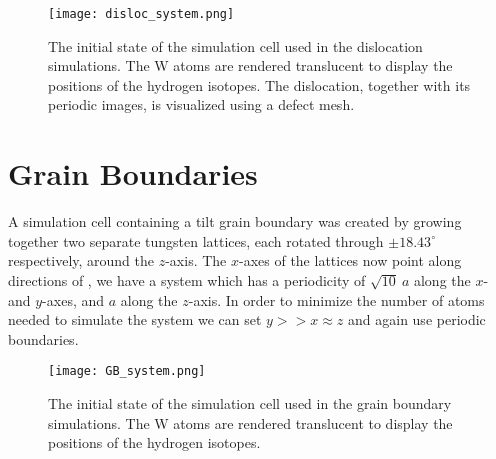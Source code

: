 \begin{figure}[!ht]
\center
\texttt{[image: disloc\_system.png]}
\caption{The initial state of the simulation cell used in the dislocation simulations. The W atoms are rendered translucent to display the positions of the hydrogen isotopes. The dislocation, together with its periodic images, is visualized using a defect mesh.}
\label{Fig:disloc_system}
\end{figure}

\section{Grain Boundaries}
A simulation cell containing a \hkl[001] tilt grain boundary was created by growing together two separate tungsten lattices, each rotated through $\pm18.43^\circ$ respectively, around the $z$-axis. The $x$-axes of the lattices now point along directions of , we have a system which has a periodicity of $\sqrt{10}~a$ along the $x$- and $y$-axes, and $a$ along the $z$-axis. In order to minimize the number of atoms needed to simulate the system we can set $y >> x \approx z$ and again use periodic boundaries.


\begin{figure}[!ht]
\center
\texttt{[image: GB\_system.png]}
\caption{The initial state of the simulation cell used in the grain boundary simulations. The W atoms are rendered translucent to display the positions of the hydrogen isotopes.}
\label{Fig:GB_system}
\end{figure}

